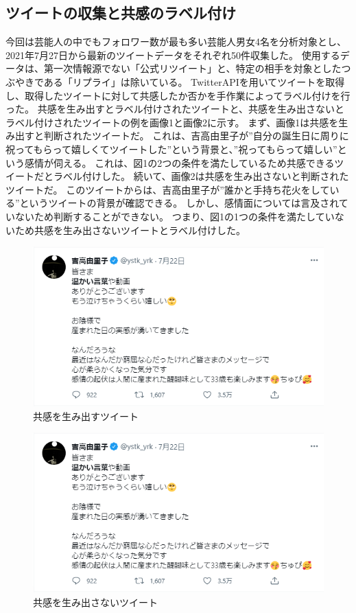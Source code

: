 \documentclass[dvipdfmx]{issj}
\begin{document}
\subsection{ツイートの収集と共感のラベル付け }  %
今回は芸能人の中でもフォロワー数が最も多い芸能人男女4名を分析対象とし、2021年7月27日から最新のツイートデータをそれぞれ50件収集した。
使用するデータは、第一次情報源でない「公式リツイート」と、特定の相手を対象としたつぶやきである「リプライ」は除いている。
TwitterAPIを用いてツイートを取得し、取得したツイートに対して共感したか否かを手作業によってラベル付けを行った。
共感を生み出すとラベル付けされたツイートと、共感を生み出さないとラベル付けされたツイートの例を画像1と画像2に示す。
まず、画像1は共感を生み出すと判断されたツイートだ。
これは、吉高由里子が”自分の誕生日に周りに祝ってもらって嬉しくてツイートした”という背景と、”祝ってもらって嬉しい”という感情が伺える。
これは、図1の2つの条件を満たしているため共感できるツイートだとラベル付けした。
続いて、画像2は共感を生み出さないと判断されたツイートだ。
このツイートからは、吉高由里子が”誰かと手持ち花火をしている”というツイートの背景が確認できる。
しかし、感情面については言及されていないため判断することができない。
つまり、図1の1つの条件を満たしていないため共感を生み出さないツイートとラベル付けした。

\begin{figure}[htbp]\centering
\includegraphics{fig1.png}
\caption{共感を生み出すツイート}\label{fig:example} 
\end{figure}

\begin{figure}[htbp]\centering
\includegraphics{fig1.png}
\caption{共感を生み出さないツイート}\label{fig:example} 
\end{figure}
\end{document}
